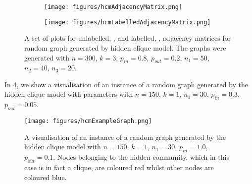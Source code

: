 \begin{figure}
	\centering
	\begin{subfigure}{.5\textwidth}
		\centering
		\texttt{[image: figures/hcmAdjacencyMatrix.png]}
		\caption{}
		\label{fig:hcmUnlabelledAdjacencyMatrixPlot}
	\end{subfigure}%
	\begin{subfigure}{.5\textwidth}
		\centering
		\texttt{[image: figures/hcmLabelledAdjacencyMatrix.png]}
		\caption{}
		\label{fig:hcmLabelledAdjacencyMatrixPlot}
	\end{subfigure}
	\caption[Plots of adjacency matrices of graph generated by hidden clique model.]{\label{fig:hcmAdjacencyMatricesPlots} A set of plots for unlabelled, , and labelled, , adjacency matrices for random graph generated by hidden clique model. The graphs were generated with $n = 300$, $k = 3$, $p_{in} = 0.8$, $p_{out} = 0.2$, $n_{1} = 50$, $n_{2} = 40$, $n_{3} = 20$.}
\end{figure}

In \cref{fig:hcmExampleGraph}, we show a visualisation of an instance of a random graph generated by the hidden clique model with parameters with $n = 150$, $k = 1$, $n_{1} = 30$, $p_{in} = 0.3$, $p_{out} = 0.05$.

\begin{figure}
	\centering
	\texttt{[image: figures/hcmExampleGraph.png]}
	\caption[Visualisation of a graph generated by the hidden clique model.]{\label{fig:hcmExampleGraph} A visualisation of an instance of a random graph generated by the hidden clique model with $n = 150$, $k = 1$, $n_{1} = 30$, $p_{in} = 1.0$, $p_{out} = 0.1$. Nodes belonging to the hidden community, which in this case is in fact a clique, are coloured red whilst other nodes are coloured blue.}
\end{figure}

